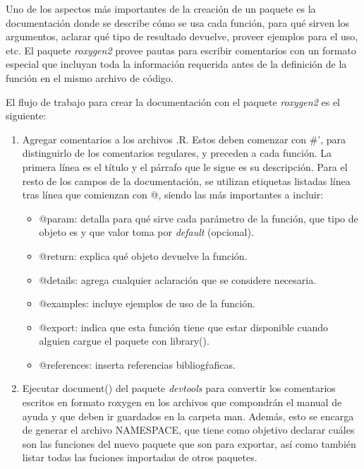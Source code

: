Uno de los aspectos más importantes de la creación de un paquete es la documentación donde se describe cómo se usa cada función, para qué sirven los argumentos, aclarar qué tipo de resultado devuelve, proveer ejemplos para el uso, etc. El paquete \emph{roxygen2} provee pautas para escribir comentarios con un formato especial que incluyan toda la información requerida antes de la definición de la función en el mismo archivo de código. 

El flujo de trabajo para crear la documentación con el paquete \emph{roxygen2} es el siguiente:

\begin{enumerate}

\item Agregar comentarios a los archivos .R. Estos deben comenzar con \#', para distinguirlo de los comentarios regulares, y preceden a cada función. La primera línea es el título y el párrafo que le sigue es su descripción. Para el resto de los campos de la documentación, se utilizan etiquetas listadas línea tras línea que comienzan con @, siendo las más importantes a incluir:

\begin{itemize}
\item @param: detalla para qué sirve cada parámetro de la función, que tipo de objeto es y que valor toma por \emph{default} (opcional).
\item @return: explica qué objeto devuelve la función.
\item @details: agrega cualquier aclaración que se considere necesaria.
\item @examples: incluye ejemplos de uso de la función.
\item @export: indica que esta función tiene que estar disponible cuando alguien cargue el paquete con \textcolor{fandango}{library()}.
\item @references: inserta referencias bibliogŕaficas.
\end{itemize}

\item Ejecutar \textcolor{fandango}{document()} del paquete \emph{devtools} para convertir los comentarios escritos en formato roxygen en los archivos que compondrán el manual de ayuda y que deben ir guardados en la carpeta man. Además, esto se encarga de generar el archivo NAMESPACE, que tiene como objetivo declarar cuáles son las funciones del nuevo paquete que son para exportar, así como también listar todas las fuciones importadas de otros paquetes.

\end{enumerate}

